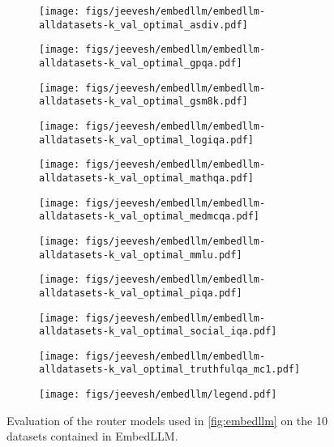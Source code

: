 \newcommand{\iw}{0.99\textwidth}
\begin{figure}[ht]
  \begin{minipage}[b]{.98\linewidth}
    \begin{subfigure}{0.33\textwidth}
        \texttt{[image: figs/jeevesh/embedllm/embedllm-alldatasets-k\_val\_optimal\_asdiv.pdf]}
    \end{subfigure}
    \begin{subfigure}{0.33\textwidth}
        \texttt{[image: figs/jeevesh/embedllm/embedllm-alldatasets-k\_val\_optimal\_gpqa.pdf]}
    \end{subfigure}
     \begin{subfigure}{0.33\textwidth}
        \texttt{[image: figs/jeevesh/embedllm/embedllm-alldatasets-k\_val\_optimal\_gsm8k.pdf]}
    \end{subfigure}
    
     \begin{subfigure}{0.33\textwidth}
        \texttt{[image: figs/jeevesh/embedllm/embedllm-alldatasets-k\_val\_optimal\_logiqa.pdf]}
    \end{subfigure}
    \begin{subfigure}{0.33\textwidth}
        \texttt{[image: figs/jeevesh/embedllm/embedllm-alldatasets-k\_val\_optimal\_mathqa.pdf]}
    \end{subfigure}
     \begin{subfigure}{0.33\textwidth}
        \texttt{[image: figs/jeevesh/embedllm/embedllm-alldatasets-k\_val\_optimal\_medmcqa.pdf]}
    \end{subfigure}
    
    
     \begin{subfigure}{0.33\textwidth}
        \texttt{[image: figs/jeevesh/embedllm/embedllm-alldatasets-k\_val\_optimal\_mmlu.pdf]}
    \end{subfigure}
    \begin{subfigure}{0.33\textwidth}
        \texttt{[image: figs/jeevesh/embedllm/embedllm-alldatasets-k\_val\_optimal\_piqa.pdf]}
    \end{subfigure}
     \begin{subfigure}{0.33\textwidth}
        \texttt{[image: figs/jeevesh/embedllm/embedllm-alldatasets-k\_val\_optimal\_social\_iqa.pdf]}
    \end{subfigure}
  
  \begin{subfigure}{0.33\textwidth}
        \texttt{[image: figs/jeevesh/embedllm/embedllm-alldatasets-k\_val\_optimal\_truthfulqa\_mc1.pdf]}
    \end{subfigure}
    \begin{subfigure}{0.33\textwidth}
        \texttt{[image: figs/jeevesh/embedllm/legend.pdf]}
    \end{subfigure}
    
  \end{minipage}
  \caption{Evaluation of the router models used in \cref{fig:embedllm}  on the 10 datasets contained in EmbedLLM.} 
  \label{fig:embedllm_each_dataset}
\end{figure}

